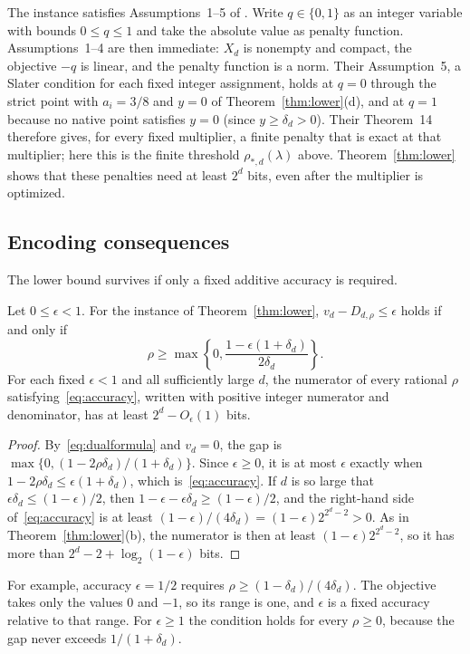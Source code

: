 \begin{remark}
The instance satisfies Assumptions~1--5 of \citet{LefebvreSchmidt2025}.
Write $q\in\{0,1\}$ as an integer variable with bounds $0\le q\le1$ and
take the absolute value as penalty function. Assumptions~1--4 are then
immediate: $X_d$ is nonempty and compact, the objective $-q$ is linear,
and the penalty function is a norm. Their Assumption~5, a Slater condition
for each fixed integer assignment, holds at $q=0$ through the strict point
with $a_i=3/8$ and $y=0$ of Theorem~\ref{thm:lower}(d), and at $q=1$
because no native point satisfies $y=0$ (since $y\ge\delta_d>0$). Their
Theorem~14 therefore gives, for every fixed multiplier, a finite penalty
that is exact at that multiplier; here this is the finite threshold
$\rho_{*,d}(\lambda)$ above. Theorem~\ref{thm:lower} shows that these
penalties need at least $2^d$ bits, even after the multiplier is optimized.
\end{remark}

\subsection{Encoding consequences}
The lower bound survives if only a fixed additive accuracy is required.

\begin{corollary}\label{cor:accuracy}
Let $0\le\epsilon<1$. For the instance of Theorem~\ref{thm:lower},
$v_d-D_{d,\rho}\le\epsilon$ holds if and only if
\begin{equation}\label{eq:accuracy}
 \rho\ge\max\left\{0,\frac{1-\epsilon(1+\delta_d)}{2\delta_d}\right\}.
\end{equation}
For each fixed $\epsilon<1$ and all sufficiently large $d$, the numerator
of every rational $\rho$ satisfying~\eqref{eq:accuracy}, written with
positive integer numerator and denominator, has at least
$2^d-O_\epsilon(1)$ bits.
\end{corollary}
\begin{proof}
By~\eqref{eq:dualformula} and $v_d=0$, the gap is
$\max\{0,(1-2\rho\delta_d)/(1+\delta_d)\}$. Since $\epsilon\ge0$, it is at
most $\epsilon$ exactly when $1-2\rho\delta_d\le\epsilon(1+\delta_d)$,
which is~\eqref{eq:accuracy}. If $d$ is so large that
$\epsilon\delta_d\le(1-\epsilon)/2$, then
$1-\epsilon-\epsilon\delta_d\ge(1-\epsilon)/2$, and the right-hand side
of~\eqref{eq:accuracy} is at least
$(1-\epsilon)/(4\delta_d)=(1-\epsilon)2^{2^d-2}>0$. As in
Theorem~\ref{thm:lower}(b), the numerator is then at least
$(1-\epsilon)2^{2^d-2}$, so it has more than $2^d-2+\log_2(1-\epsilon)$
bits.
\end{proof}
For example, accuracy $\epsilon=1/2$ requires
$\rho\ge(1-\delta_d)/(4\delta_d)$. The objective takes only the values $0$
and $-1$, so its range is one, and $\epsilon$ is a fixed accuracy relative
to that range. For $\epsilon\ge1$ the condition holds for every
$\rho\ge0$, because the gap never exceeds $1/(1+\delta_d)$.

